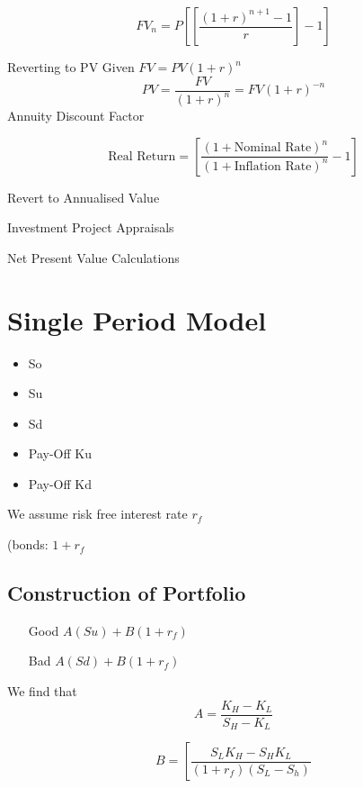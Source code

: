 \[ FV_n = P\left[ \left[  \frac{(1+r)^{n+1}-1}{r} \right] -1 \right] \]


 Reverting to PV
 Given $FV = PV(1+r)^n$
\[
PV = \frac{FV}{(1+r)^n} = FV(1+r)^{-n} 
\]
Annuity Discount Factor

\[ \mbox{Real Return} = \left[\frac{(1+ \mbox{Nominal Rate})^n}{(1+ \mbox{Inflation Rate})^n} -1 \right] \]

Revert to Annualised Value

Investment Project Appraisals

Net Present Value Calculations


\section*{Single Period Model}

\begin{itemize}
\item So
\item Su
\item Sd
\item Pay-Off Ku
\item Pay-Off Kd
\end{itemize}

We assume risk free interest rate $r_f$

(bonds: $1+r_f$
\subsection*{Construction of Portfolio}

\begin{itemize}
\item[Good] $A(Su) + B(1+r_f)$
\item[Bad] $A(Sd) + B(1+r_f)$
\end{itemize}

We find that 
\[A = \frac{K_H-K_L}{S_H-K_L}\]

\[B = \left[    \frac{S_LK_H - S_HK_L}{(1+r_f)(S_L-S_h)}   \]
